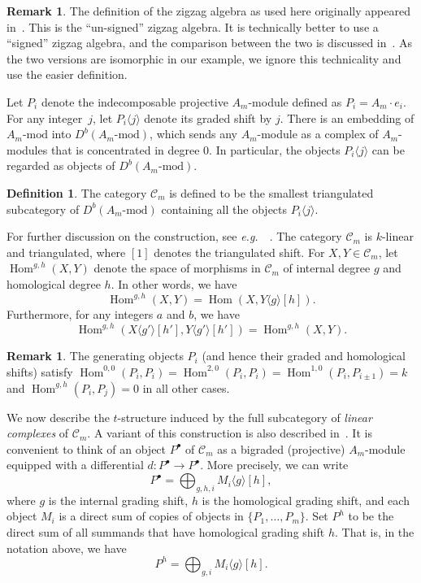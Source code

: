 \documentclass{amsart}
\theoremstyle{definition}
\newtheorem{definition}[theorem]{Definition}
\newtheorem{remark}[theorem]{Remark}
\DeclareMathOperator{\Hom}{Hom} %
\newcommand{\eg}{\textit{e.g.}~} %
\newcommand{\darkblue}{\color{darkblue}} %
\newcommand{\defn}[1]{\textsl{\darkblue #1}} %
\begin{document}
\begin{remark}
The definition of the zigzag algebra as used here originally appeared in~\cite[Sect.~3]{hue.kho:01}.
This is the ``un-signed'' zigzag algebra.
It is technically better to use a ``signed'' zigzag algebra, and the comparison between the two is discussed in~\cite[Rem.~6.6]{bap.deo.lic:20}.
As the two versions are isomorphic in our example, we ignore this technicality and use the easier definition.
\end{remark}

Let \(P_i\) denote the indecomposable projective \(A_m\)-module defined as \(P_i = A_m\cdot e_i\).
For any integer~\(j\), let \(P_i \langle j \rangle\) denote its graded shift by \(j\).
There is an embedding of \(A_m\text{-mod}\) into \(D^b(A_m\text{-mod})\), which sends any \(A_m\)-module as a complex of \(A_m\)-modules that is concentrated in degree \(0\).
In particular, the objects \(P_i\langle j \rangle\) can be regarded as objects of \(D^b(A_m\text{-mod})\).

\begin{definition}
The category \(\mathcal{C}_m\) is defined to be the smallest triangulated subcategory of \(D^b(A_m\text{-mod})\) containing all the objects \(P_i\langle j \rangle\).
\end{definition}

For further discussion on the construction, see \eg~\cite[Sect.~2.3.3]{bap.deo.lic:22}.
The category \(\mathcal{C}_m\) is \(k\)-linear and triangulated, where \([1]\) denotes the triangulated shift.
For \(X, Y \in \mathcal{C}_m\), let \(\Hom^{g,h}(X,Y)\) denote the space of morphisms in \(\mathcal{C}_m\) of internal degree \(g\) and homological degree \(h\).
In other words, we have
\[
\Hom^{g,h}(X,Y) = \Hom(X,Y\langle g \rangle[h]).
\]
Furthermore, for any integers \(a\) and \(b\), we have
\[
\Hom^{g,h}(X\langle g' \rangle[h'], Y\langle g' \rangle[h']) = \Hom^{g,h}(X,Y).
\]

\begin{remark}
\label{rem:generating-morphisms}
The generating objects \(P_i\) (and hence their graded and homological shifts) satisfy \(\Hom^{0,0}(P_i,P_i) = \Hom^{2,0}(P_i,P_i) = \Hom^{1,0}(P_i,P_{i\pm1}) = k\) and \(\Hom^{g,h}(P_i, P_j) = 0\) in all other cases.
\end{remark}

We now describe the \(t\)-structure induced by the full subcategory of \defn{linear complexes} of \(\mathcal{C}_m\).
A variant of this construction is also described in~\cite[Sect.~2.5]{lic.que:21}.
It is convenient to think of an object \(P^{\bullet}\) of \(\mathcal{C}_m\) as a bigraded (projective) \(A_m\)-module equipped with a differential \(d \colon P^{\bullet} \to P^{\bullet}\).
More precisely, we can write
\[
P^{\bullet} = \bigoplus_{g,h,i} M_i\langle g \rangle[h],
\]
where \(g\) is the internal grading shift, \(h\) is the homological grading shift, and 
each object \(M_i\) is a direct sum of copies of objects in \(\{P_1,\ldots, P_m\}\).
Set \(P^h\) to be the direct sum of all summands that have homological grading shift \(h\).
That is, in the notation above, we have
\[
P^{h} = \bigoplus_{g,i} M_i\langle g \rangle[h].
\]
\end{document}
